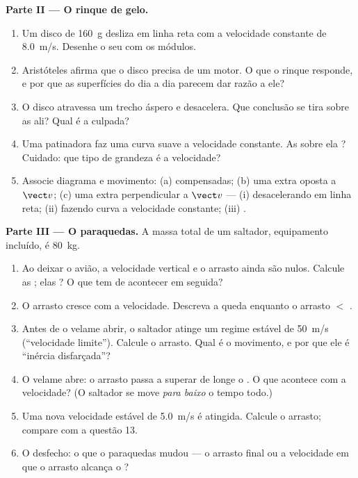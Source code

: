 \begin{problem}
\medskip
\noindent\textbf{Parte II --- O rinque de gelo.}
\begin{enumerate}[resume]
  \item Um disco de \qty{160}{g} desliza em linha reta com a velocidade
        constante de \qty{8.0}{m/s}. Desenhe o seu  com
        os módulos.
  \item Aristóteles afirma que o disco precisa de um motor. O que o
        rinque responde, e por que as superfícies do dia a dia parecem
        dar razão a ele?
  \item O disco atravessa um trecho áspero e desacelera. Que conclusão se
        tira sobre as  ali? Qual  é a culpada?
  \item Uma patinadora faz uma curva suave a velocidade constante. As
         sobre ela ? Cuidado: que tipo de grandeza é a
        velocidade?
  \item Associe diagrama e movimento: (a)  compensadas; (b) uma
         extra oposta a $\vect v$; (c) uma  extra perpendicular
        a $\vect v$ --- (i) desacelerando em linha reta; (ii) fazendo
        curva a velocidade constante; (iii) .
\end{enumerate}

\medskip
\noindent\textbf{Parte III --- O paraquedas.}
A massa total de um saltador, equipamento incluído, é \qty{80}{kg}.
\begin{enumerate}[resume]
  \item Ao deixar o avião, a velocidade vertical e o arrasto ainda são
        nulos. Calcule as ; elas ? O que tem de
        acontecer em seguida?
  \item O arrasto cresce com a velocidade. Descreva a queda enquanto o
        arrasto $<$ .
  \item Antes de o velame abrir, o saltador atinge um regime estável de
        \qty{50}{m/s} (``velocidade limite''). Calcule o arrasto. Qual é
        o movimento, e por que ele é ``inércia disfarçada''?
  \item O velame abre: o arrasto passa a superar de longe o . O que
        acontece com a velocidade? (O saltador se move \emph{para baixo}
        o tempo todo.)
  \item Uma nova velocidade estável de \qty{5.0}{m/s} é atingida. Calcule
        o arrasto; compare com a questão 13.
  \item O desfecho: o que o paraquedas mudou --- o arrasto final ou a
        velocidade em que o arrasto alcança o ?
\end{enumerate}


\end{problem}
